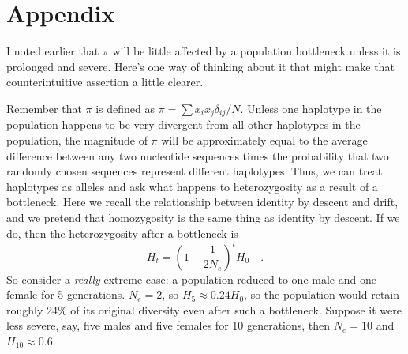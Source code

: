 \documentclass[12pt]{article}
\begin{document}
\section*{Appendix}\label{sect:appendix}

I noted earlier that $\pi$ will be little affected by a population
bottleneck unless it is prolonged and severe. Here's one way of
thinking about it that might make that counterintuitive assertion a
little clearer.

Remember that $\pi$ is defined as $\pi = \sum
x_ix_j\delta_{ij}/N$. Unless one haplotype in the population happens
to be very divergent from all other haplotypes in the population, the
magnitude of $\pi$ will be approximately equal to the average
difference between any two nucleotide sequences times the probability
that two randomly chosen sequences represent different
haplotypes. Thus, we can treat haplotypes as alleles and ask what
happens to heterozygosity as a result of a bottleneck. Here we recall
the relationship between identity by descent and drift, and we pretend
that homozygosity is the same thing as identity by descent. If we do,
then the heterozygosity after a bottleneck is
\[
H_t = \left(1 - \frac{1}{2N_e}\right)^tH_{0} \quad.
\]
So consider a {\it really\/} extreme case: a population reduced to one
male and one female for 5 generations. $N_e=2$, so $H_5 \approx
0.24H_0$, so the population would retain roughly 24\% of its original
diversity even after such a bottleneck. Suppose it were less severe,
say, five males and five females for 10 generations, then $N_e=10$ and
$H_{10} \approx 0.6$.

 


\ccLicense
\end{document}
